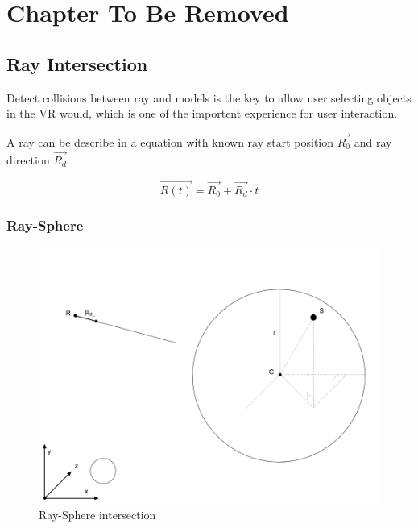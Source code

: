 \label{ChapterX}
\chapter{Chapter To Be Removed}

\section{Ray Intersection}

Detect collisions between ray and models is the key to allow user selecting objects in the VR would, which is one of the importent experience for user interaction.

A ray can be describe in a equation with known ray start position \emph{$\overrightarrow{R_{0}}$} and ray direction \emph{$\overrightarrow{R_{d}}$}.

\begin{equation}\label{equ:ray-t}
\overrightarrow{R(t)} = \overrightarrow{R_{0}} + \overrightarrow{R_{d}} \cdot t
\end{equation}


\subsection{Ray-Sphere}

\begin{figure}[h!]\label{fig:ray-sphere}
\centering
\includegraphics[width=\linewidth]{Figures/ray-sphere-intersection.png}
\decoRule
\caption[ray-sphere-intersection]{Ray-Sphere intersection}
\end{figure}

